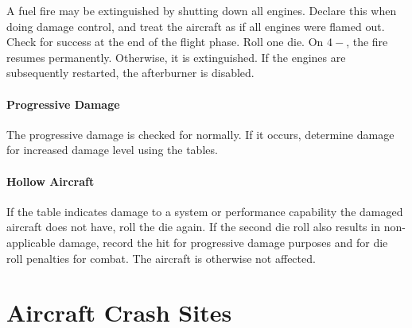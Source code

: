 \begin{advancedrules}
{A fuel fire may be extinguished by shutting down all engines. Declare this when doing damage control, and treat the aircraft as if all engines were flamed out. Check for success at the end of the flight phase. Roll one die. On $4-$, the fire resumes permanently. Otherwise, it is extinguished. If the engines are subsequently restarted, the afterburner is disabled.

\paragraph{Progressive Damage} The progressive damage is checked for normally. If it occurs, determine damage for increased damage level using the tables.

\paragraph{Hollow Aircraft} If the table indicates damage to a system or performance capability the damaged aircraft does not have, roll the die again. If the second die roll also results in non-applicable damage, record the hit for progressive damage purposes and for die roll penalties for combat. The aircraft is otherwise not affected.

}

\section{Aircraft Crash Sites}


\end{advancedrules}
